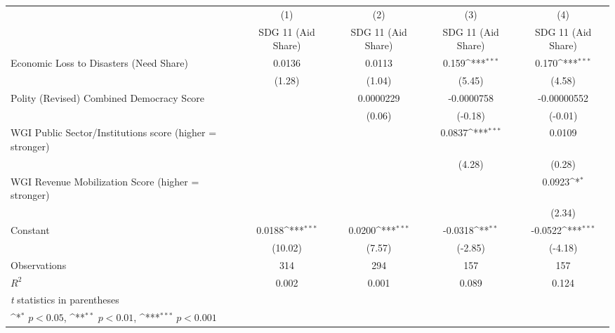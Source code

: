 {
\def\sym#1{\ifmmode^{#1}\else\(^{#1}\)\fi}
\begin{tabular}{l*{4}{c}}
\hline\hline
                &\multicolumn{1}{c}{(1)}&\multicolumn{1}{c}{(2)}&\multicolumn{1}{c}{(3)}&\multicolumn{1}{c}{(4)}\\
                &\multicolumn{1}{c}{SDG 11 (Aid Share)}&\multicolumn{1}{c}{SDG 11 (Aid Share)}&\multicolumn{1}{c}{SDG 11 (Aid Share)}&\multicolumn{1}{c}{SDG 11 (Aid Share)}\\
\hline
Economic Loss to Disasters (Need Share)&   0.0136         &   0.0113         &    0.159\sym{***}&    0.170\sym{***}\\
                &   (1.28)         &   (1.04)         &   (5.45)         &   (4.58)         \\
[1em]
Polity (Revised) Combined Democracy Score&                  &0.0000229         &-0.0000758         &-0.00000552         \\
                &                  &   (0.06)         &  (-0.18)         &  (-0.01)         \\
[1em]
WGI Public Sector/Institutions score (higher = stronger)&                  &                  &   0.0837\sym{***}&   0.0109         \\
                &                  &                  &   (4.28)         &   (0.28)         \\
[1em]
WGI Revenue Mobilization Score (higher = stronger)&                  &                  &                  &   0.0923\sym{*}  \\
                &                  &                  &                  &   (2.34)         \\
[1em]
Constant        &   0.0188\sym{***}&   0.0200\sym{***}&  -0.0318\sym{**} &  -0.0522\sym{***}\\
                &  (10.02)         &   (7.57)         &  (-2.85)         &  (-4.18)         \\
\hline
Observations    &      314         &      294         &      157         &      157         \\
\(R^{2}\)       &    0.002         &    0.001         &    0.089         &    0.124         \\
\hline\hline
\multicolumn{5}{l}{\footnotesize \textit{t} statistics in parentheses}\\
\multicolumn{5}{l}{\footnotesize \sym{*} \(p<0.05\), \sym{**} \(p<0.01\), \sym{***} \(p<0.001\)}\\
\end{tabular}
}
